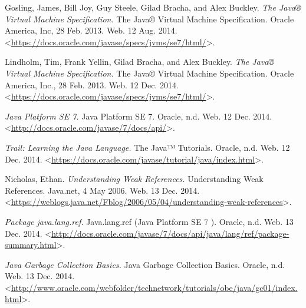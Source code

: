 

\begin{thebibliography}{9}

Gosling, James, Bill Joy, Guy Steele, Gilad Bracha, and Alex Buckley. \textit{The Java® Virtual Machine Specification.} The Java® Virtual Machine Specification. Oracle America, Inc, 28 Feb. 2013. Web. 12 Aug. 2014. <\url{https://docs.oracle.com/javase/specs/jvms/se7/html/}>.



Lindholm, Tim, Frank Yellin, Gilad Bracha, and Alex Buckley. \textit{The Java® Virtual Machine Specification.} The Java® Virtual Machine Specification. Oracle America, Inc., 28 Feb. 2013. Web. 12 Dec. 2014. <\url{https://docs.oracle.com/javase/specs/jvms/se7/html/}>.


\textit{Java Platform SE 7.} Java Platform SE 7. Oracle, n.d. Web. 12 Dec. 2014. <\url{http://docs.oracle.com/javase/7/docs/api/}>.


\textit{Trail: Learning the Java Language.} The Java™ Tutorials. Oracle, n.d. Web. 12 Dec. 2014. <\url{https://docs.oracle.com/javase/tutorial/java/index.html}>.


Nicholas, Ethan. \textit{Understanding Weak References.} Understanding Weak References. Java.net, 4 May 2006. Web. 13 Dec. 2014. <\url{https://weblogs.java.net/Fblog/2006/05/04/understanding-weak-references}>.


\textit{Package java.lang.ref.} Java.lang.ref (Java Platform SE 7 ). Oracle, n.d. Web. 13 Dec. 2014. <\url{http://docs.oracle.com/javase/7/docs/api/java/lang/ref/package-summary.html}>.


\textit{Java Garbage Collection Basics.} Java Garbage Collection Basics. Oracle, n.d. Web. 13 Dec. 2014. <\url{http://www.oracle.com/webfolder/technetwork/tutorials/obe/java/gc01/index.html}>.


\end{thebibliography}
